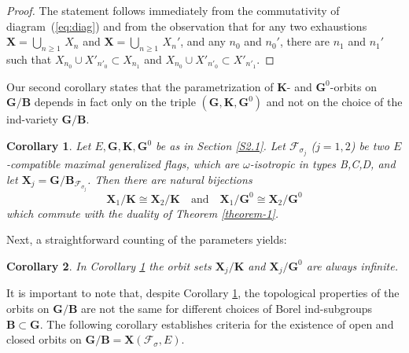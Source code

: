 \documentclass{amsart}
\newtheorem{corollary}{Corollary}
\theoremstyle{definition}
\begin{document}
\begin{proof}
        The statement follows immediately from the commutativity of diagram~(\ref{eq:diag}) and from the observation that for any two exhaustions $\mathbf{X}=\bigcup_{n\geq 1}\,X_n$ and $\mathbf{X}=\bigcup_{n\geq 1}\,X_n'$, and any $n_0$ and $n_0'$, there are $n_1$ and $n_1'$ such that $X_{n_0}\cup X'_{n'_0}\subset X_{n_1}$ and $X_{n_0}\cup X'_{n'_0}\subset X'_{n'_1}$.
\end{proof}


Our second corollary states that the parametrization of $\mathbf{K}$- and $\mathbf{G}^0$-orbits on $\mathbf{G}/\mathbf{B}$ depends in fact only on the triple $\left(\mathbf{G},\mathbf{K},\mathbf{G}^0\right)$ and not on the choice of the ind-variety $\mathbf{G}/\mathbf{B}$.

\begin{corollary}
\label{C1}
Let $E,\mathbf{G},\mathbf{K},\mathbf{G}^0$ be as in Section \ref{S2.1}.
Let $\mathcal{F}_{\sigma_j}$ ($j=1,2$) be two 
$E$-compatible
maximal generalized flags, which are $\omega$-isotropic in types B,C,D,
and let $\mathbf{X}_j=\mathbf{G}/\mathbf{B}_{\mathcal{F}_{\sigma_j}}$.
Then there are natural bijections 
\[
\mathbf{X}_1/\mathbf{K}\cong\mathbf{X}_2/\mathbf{K}
\quad\mbox{and}\quad
\mathbf{X}_1/\mathbf{G}^0\cong\mathbf{X}_2/\mathbf{G}^0
\]
which commute with the duality of Theorem \ref{theorem-1}.
\end{corollary}

Next, a straightforward counting of the parameters yields:

\begin{corollary}
\label{C2}
In Corollary \ref{C1}
the orbit sets $\mathbf{X}_j/\mathbf{K}$ and $\mathbf{X}_j/\mathbf{G}^0$
are always infinite.
\end{corollary}


It is important to note that, despite Corollary \ref{C1}, the topological properties of the orbits on $\mathbf{G}/\mathbf{B}$ are not the same for different choices of Borel ind-subgroups $\mathbf{B}\subset\mathbf{G}$.  The following corollary establishes criteria for the existence of open and closed orbits on $\mathbf{G}/\mathbf{B}=\mathbf{X}\left(\mathcal{F}_\sigma,E\right)$.
\end{document}
